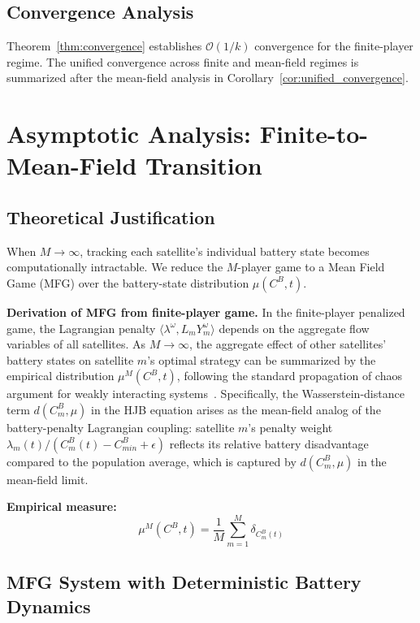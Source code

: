 \documentclass[journal]{IEEEtran}
\newcommand{\CB}{C^{B}}
\newcommand{\CBmin}{C^{B}_{min}}
\begin{document}
\subsection{Convergence Analysis}
Theorem~\ref{thm:convergence} establishes $\mathcal{O}(1/k)$ convergence for the finite-player regime. The unified convergence across finite and mean-field regimes is summarized after the mean-field analysis in Corollary~\ref{cor:unified_convergence}.

\section{Asymptotic Analysis: Finite-to-Mean-Field Transition}
\label{sec:asymptotic}

\subsection{Theoretical Justification}

When $M\to\infty$, tracking each satellite's individual battery state becomes computationally intractable. We reduce the $M$-player game to a Mean Field Game (MFG) over the battery-state distribution $\mu(\CB,t)$.

\textbf{Derivation of MFG from finite-player game.}
In the finite-player penalized game, the Lagrangian penalty $\langle\lambda^\omega, L_m Y_m^\omega\rangle$ depends on the aggregate flow variables of all satellites. As $M\to\infty$, the aggregate effect of other satellites' battery states on satellite $m$'s optimal strategy can be summarized by the empirical distribution $\mu^M(\CB,t)$, following the standard propagation of chaos argument for weakly interacting systems~\cite{lasry2007mfg}. Specifically, the Wasserstein-distance term $d(\CB_m, \mu)$ in the HJB equation arises as the mean-field analog of the battery-penalty Lagrangian coupling: satellite $m$'s penalty weight $\lambda_m(t)/(\CB_m(t)-\CBmin+\epsilon)$ reflects its relative battery disadvantage compared to the population average, which is captured by $d(\CB_m, \mu)$ in the mean-field limit.

\textbf{Empirical measure:}
\begin{equation}
    \mu^M(\CB,t) = \frac{1}{M}
    \sum_{m=1}^{M}\delta_{\CB_m(t)}
    \label{eq:emp_measure}
\end{equation}

\subsection{MFG System with Deterministic Battery
Dynamics}
\end{document}
